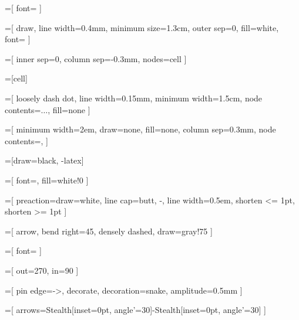 \newcommand{\true}{\textcolor{green}{\ding{51}}}
\newcommand{\false}{\textcolor{red}{\ding{55}}}

=[
  font=\large
]

=[
  draw,
  line width=0.4mm,
  minimum size=1.3cm,
  outer sep=0,
  fill=white,
  font=\large
]

=[
  inner sep=0,
  column sep=-0.3mm,
  nodes=cell
]

=[cell]

=[
  loosely dash dot,
  line width=0.15mm,
  minimum width=1.5cm,
  node contents=$\ldots$,
  fill=none
]

\newcommand{\ellipsis}{ \node [ellipsis]; }

=[
  minimum width=2em,
  draw=none,
  fill=none,
  column sep=0.3mm,
  node contents={,}
]

\newcommand{\tuplecomma}{ \node [tuple comma]; }

=[draw=black, -latex]

=[
  font=\small,
  fill=white!0
]

=[
  preaction={draw=white, line cap=butt, -, line width=0.5em},
  shorten <= 1pt,
  shorten >= 1pt
]

=[
  arrow,
  bend right=45,
  densely dashed,
  draw=gray!75
]

=[
  font=\small
]

=[
  out=270,
  in=90
]

=[
  pin edge={->, decorate, decoration={snake, amplitude=0.5mm}}
]

=[
  arrows={Stealth[inset=0pt, angle'=30]-Stealth[inset=0pt, angle'=30]}
]

\newcommand{\bottommeasure}[4][5mm] {
  \begin{scope}[line width=0.1mm]
    \coordinate (x) at ([yshift=-#1] #3);
    \draw (x) [measure] -- node [label={[label distance=-1mm]above:#2}] {} (x -| #4);
    \draw (#3) -- ++(0, -#1) -- +(0, -1.25mm);
    \draw (#4) -- ++(0, -#1) -- +(0, -1.25mm);
  \end{scope}
}

\newcommand{\topmeasure}[4][5mm] {
  \begin{scope}[line width=0.1mm]
    \coordinate (x) at ([yshift=#1] #3);
    \draw (x) [measure] -- node [label={[label distance=-1mm]above:#2}] {} (x -| #4);
    \draw (#3) -- ++(0, #1) -- +(0, 1.25mm);
    \draw (#4) -- ++(0, #1) -- +(0, 1.25mm);
  \end{scope}
}

